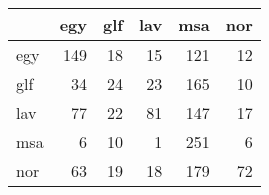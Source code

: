 \begin{tabular}{lrrrrr}
\hline
     &   egy &   glf &   lav &   msa &   nor \\
\hline
 egy &   149 &    18 &    15 &   121 &    12 \\
 glf &    34 &    24 &    23 &   165 &    10 \\
 lav &    77 &    22 &    81 &   147 &    17 \\
 msa &     6 &    10 &     1 &   251 &     6 \\
 nor &    63 &    19 &    18 &   179 &    72 \\
\hline
\end{tabular}